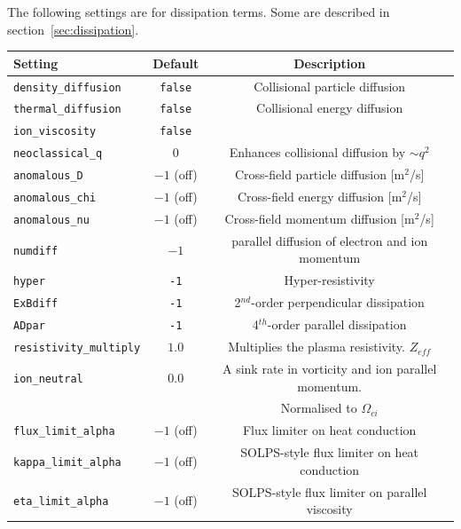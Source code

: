 \documentclass[12pt,a4paper]{article}
\begin{document}
The following settings are for dissipation terms.
Some are described in section~\ref{sec:dissipation}.
\begin{center}
\begin{tabular}{l c c}
  Setting & Default & Description \\
  \hline
  \texttt{density\_diffusion} & \texttt{false} & Collisional particle diffusion \\
  \texttt{thermal\_diffusion} & \texttt{false} & Collisional energy diffusion \\
  \texttt{ion\_viscosity} & \texttt{false} &  \\
  \texttt{neoclassical\_q} & $0$ & Enhances collisional diffusion by $\sim q^2$ \\
  \hline
  \texttt{anomalous\_D} & $-1$ (off) & Cross-field particle diffusion [m$^2$/s] \\
  \texttt{anomalous\_chi} & $-1$ (off) & Cross-field energy diffusion [m$^2$/s] \\
  \texttt{anomalous\_nu} & $-1$ (off) & Cross-field momentum diffusion [m$^2$/s] \\
  \hline
  \texttt{numdiff} & $-1$ & parallel diffusion of electron and ion momentum \\
  \texttt{hyper} & \texttt{-1} & Hyper-resistivity \\
  \texttt{ExBdiff} & \texttt{-1} & 2$^{nd}$-order perpendicular dissipation \\
  \texttt{ADpar} & \texttt{-1} & 4$^{th}$-order parallel dissipation \\
  \hline
  \texttt{resistivity\_multiply} & $1.0$ & Multiplies the plasma resistivity. $Z_{eff}$ \\
  \texttt{ion\_neutral} & $0.0$ & A sink rate in vorticity and ion parallel momentum. \\
  & & Normalised to $\Omega_{ci}$ \\
  \texttt{flux\_limit\_alpha} & $-1$ (off) & Flux limiter on heat conduction\\
  \texttt{kappa\_limit\_alpha} & $-1$ (off) & SOLPS-style flux limiter on heat conduction \\
  \texttt{eta\_limit\_alpha} & $-1$ (off) & SOLPS-style flux limiter on parallel viscosity \\
  \hline
\end{tabular}
\end{center}
\end{document}
